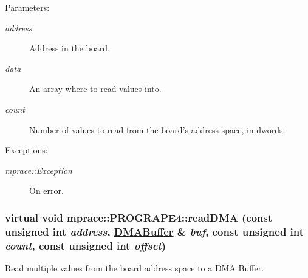 \begin{Desc}
\item[Parameters:]
\begin{description}
\item[{\em address}]Address in the board. \item[{\em data}]An array where to read values into. \item[{\em count}]Number of values to read from the board's address space, in dwords. \end{description}
\end{Desc}
\begin{Desc}
\item[Exceptions:]
\begin{description}
\item[{\em mprace::Exception}]On error.\end{description}
\end{Desc}
\hypertarget{classmprace_1_1PROGRAPE4_a7}{
\subsubsection[readDMA]{\setlength{\rightskip}{0pt plus 5cm}virtual void mprace::PROGRAPE4::read\-DMA (const unsigned int {\em address}, \hyperlink{classmprace_1_1DMABuffer}{DMABuffer} \& {\em buf}, const unsigned int {\em count}, const unsigned int {\em offset})}}
\label{classmprace_1_1PROGRAPE4_a7}


Read multiple values from the board address space to a DMA Buffer. 

